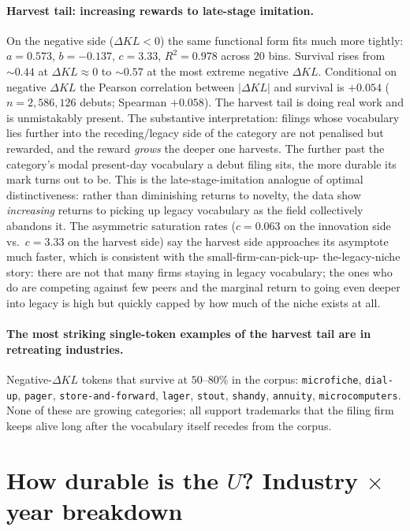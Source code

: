\documentclass[11pt]{article}
\begin{document}
\paragraph{Harvest tail: increasing rewards to late-stage imitation.}
On the negative side ($\Delta KL < 0$) the same functional form fits
much more tightly: $a = 0.573$, $b = -0.137$, $c = 3.33$, $R^2 =
0.978$ across $20$ bins. Survival rises from $\sim 0.44$ at $\Delta
KL \approx 0$ to $\sim 0.57$ at the most extreme negative $\Delta
KL$. Conditional on negative $\Delta KL$ the Pearson correlation
between $|\Delta KL|$ and survival is $+0.054$ ($n = 2{,}586{,}126$
debuts; Spearman $+0.058$). The harvest tail is doing real work and
is unmistakably present. The substantive interpretation: filings
whose vocabulary lies further into the receding/legacy side of the
category are not penalised but rewarded, and the reward \emph{grows}
the deeper one harvests. The further past the category's modal
present-day vocabulary a debut filing sits, the more durable its
mark turns out to be. This is the late-stage-imitation analogue of
optimal distinctiveness: rather than diminishing returns to novelty,
the data show \emph{increasing} returns to picking up legacy
vocabulary as the field collectively abandons it. The asymmetric
saturation rates ($c = 0.063$ on the innovation side vs.\ $c = 3.33$
on the harvest side) say the harvest side approaches its asymptote
much faster, which is consistent with the small-firm-can-pick-up-
the-legacy-niche story: there are not that many firms staying in
legacy vocabulary; the ones who do are competing against few peers
and the marginal return to going even deeper into legacy is high
but quickly capped by how much of the niche exists at all.

\paragraph{The most striking single-token examples of the harvest
tail are in retreating industries.} Negative-$\Delta KL$ tokens that
survive at $50$--$80\%$ in the corpus: \texttt{microfiche},
\texttt{dial-up}, \texttt{pager}, \texttt{store-and-forward},
\texttt{lager}, \texttt{stout}, \texttt{shandy}, \texttt{annuity},
\texttt{microcomputers}. None of these are growing categories; all
support trademarks that the filing firm keeps alive long after the
vocabulary itself recedes from the corpus.

\section{How durable is the $U$? Industry $\times$ year breakdown}
\end{document}
